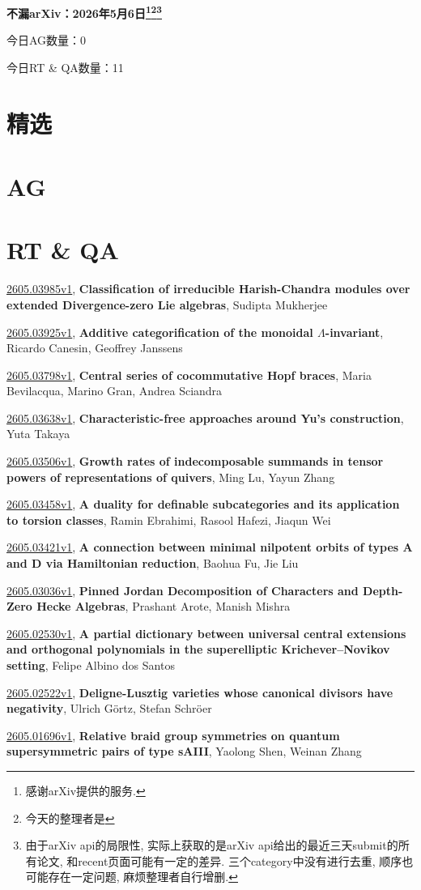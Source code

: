 \documentclass[9pt, a4paper]{article}
\theoremstyle{plain}
\theoremstyle{definition}
\theoremstyle{remark}
\newcommand{\arxiv}[3]{\href{https://arxiv.org/abs/#1}{#1}, \textbf{\textcolor{arxivblue}{#2}}, #3}
\newcommand{\AGnumber}{0}
\newcommand{\RTQAnumber}{11}
\newcommand{\NewestDate}{2026年5月6日}
\newcommand{\todayarXiver}{} %
\begin{document}
\begin{center}
    \Huge\textbf{不漏arXiv：\NewestDate\footnote{感谢arXiv提供的服务.}\footnote{今天的整理者是\todayarXiver}\footnote{由于arXiv api的局限性, 实际上获取的是arXiv api给出的最近三天submit的所有论文, 和recent页面可能有一定的差异. 三个category中没有进行去重, 顺序也可能存在一定问题, 麻烦整理者自行增删.}} \\
\end{center}

\setcounter{section}{-1}

\begin{center}
    今日AG数量：\AGnumber
    
    今日RT \& QA数量：\RTQAnumber
    
\end{center}


\section{精选}


\section{AG}

\section{RT \& QA}
\arxiv{2605.03985v1}{Classification of irreducible Harish-Chandra modules over extended Divergence-zero Lie algebras}{Sudipta Mukherjee}

\arxiv{2605.03925v1}{Additive categorification of the monoidal $Λ$-invariant}{Ricardo Canesin, Geoffrey Janssens}

\arxiv{2605.03798v1}{Central series of cocommutative Hopf braces}{Maria Bevilacqua, Marino Gran, Andrea Sciandra}

\arxiv{2605.03638v1}{Characteristic-free approaches around Yu's construction}{Yuta Takaya}

\arxiv{2605.03506v1}{Growth rates of indecomposable summands in tensor powers of representations of quivers}{Ming Lu, Yayun Zhang}

\arxiv{2605.03458v1}{A duality for definable subcategories and its application to torsion classes}{Ramin Ebrahimi, Rasool Hafezi, Jiaqun Wei}

\arxiv{2605.03421v1}{A connection between minimal nilpotent orbits of types A and D via Hamiltonian reduction}{Baohua Fu, Jie Liu}

\arxiv{2605.03036v1}{Pinned Jordan Decomposition of Characters and Depth-Zero Hecke Algebras}{Prashant Arote, Manish Mishra}

\arxiv{2605.02530v1}{A partial dictionary between universal central extensions and orthogonal polynomials in the superelliptic Krichever--Novikov setting}{Felipe Albino dos Santos}

\arxiv{2605.02522v1}{Deligne-Lusztig varieties whose canonical divisors have negativity}{Ulrich Görtz, Stefan Schröer}

\arxiv{2605.01696v1}{Relative braid group symmetries on quantum supersymmetric pairs of type sAIII}{Yaolong Shen, Weinan Zhang}

\end{document}
